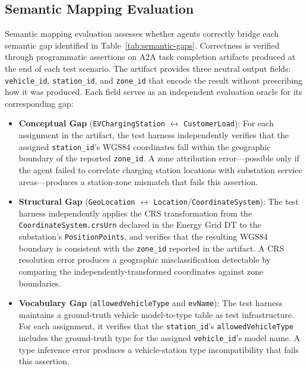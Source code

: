 \subsection{Semantic Mapping Evaluation}
\label{subsec:semantic-mapping-evaluation}

Semantic mapping evaluation assesses whether agents correctly bridge each semantic gap
    identified in Table~\ref{tab:semantic-gaps}.
Correctness is verified through programmatic assertions on A2A task completion artifacts
    produced at the end of each test scenario.
The artifact provides three neutral output fields: \texttt{vehicle\_id},
    \texttt{station\_id}, and \texttt{zone\_id} that encode the result
    without prescribing how it was produced.
Each field serves as an independent evaluation oracle for its corresponding gap:

\begin{itemize}
    \item \textbf{Conceptual Gap}
        (\texttt{EVChargingStation} $\leftrightarrow$ \texttt{CustomerLoad}):
    For each assignment in the artifact, the test harness independently verifies
        that the assigned \texttt{station\_id}'s WGS84 coordinates
        fall within the geographic boundary of the reported \texttt{zone\_id}.
    A zone attribution error---possible only if the agent failed to correlate
        charging station locations with substation service areas---produces
        a station-zone mismatch that fails this assertion.

    \item \textbf{Structural Gap}
        (\texttt{GeoLocation} $\leftrightarrow$ \texttt{Location}/\texttt{CoordinateSystem}):
    The test harness independently applies the CRS transformation from the
        \texttt{CoordinateSystem.crsUrn} declared in the Energy Grid DT
        to the substation's \texttt{PositionPoints},
        and verifies that the resulting WGS84 boundary is consistent with
        the \texttt{zone\_id} reported in the artifact.
    A CRS resolution error produces a geographic misclassification
        detectable by comparing the independently-transformed coordinates
        against zone boundaries.

    \item \textbf{Vocabulary Gap}
        (\texttt{allowedVehicleType} and \texttt{evName}):
    The test harness maintains a ground-truth vehicle model-to-type table
        as test infrastructure.
    For each assignment, it verifies that the \texttt{station\_id}'s
        \texttt{allowedVehicleType} includes the ground-truth type
        for the assigned \texttt{vehicle\_id}'s model name.
    A type inference error produces a vehicle-station type incompatibility
        that fails this assertion.
\end{itemize}

